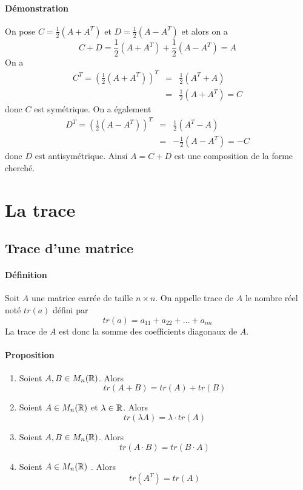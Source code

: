 \paragraph{Démonstration}  On pose $C = \frac{1}{2} ( A + A^{T})$ et $D = \frac{1}{2} ( A - A^{T})$ et alors on a
$$ C + D = \frac{1}{2} ( A + A^{T}) + \frac{1}{2} ( A - A^{T}) = A$$
On a 
\begin{eqnarray*} 
  C^{T} = (\frac{1}{2} ( A + A^{T}))^{T} &=& \frac{1}{2} ( A^{T} + A) \\
    &=& \frac{1}{2} ( A + A^{T}) = C
\end{eqnarray*}
donc $C$ est symétrique. On a également
\begin{eqnarray*}
  D^{T} = (\frac{1}{2} ( A - A^{T}))^{T} &=& \frac{1}{2} ( A^{T} - A) \\
    &=& -\frac{1}{2} ( A - A^{T}) = -C
\end{eqnarray*}
donc $D$ est antisymétrique. Ainsi $A = C + D$ est une composition de la forme cherché.

%
%
\section{La trace}
%
%
%
\subsection{Trace d'une matrice}
%
\paragraph{Définition} Soit $A$ une matrice carrée de taille $n\times n$. On appelle trace de $A$ le nombre réel noté $tr(a)$ défini par
$$tr(a) = a_{11} + a_{22} + \ldots + a_{nn}$$
La trace de $A$ est donc la somme des coefficients diagonaux de $A$.

\paragraph{Proposition}
\begin{enumerate}[1)]
  \item Soient $A, B \in M_{n}(\mathbb{R})$. Alors
    $$tr(A + B) = tr(A) + tr(B)$$
  \item Soient $A \in M_{n}(\mathbb{R})$ et $\lambda \in \mathbb{R}$. Alors
    $$tr(\lambda A) = \lambda \cdot tr(A)$$
  \item Soient $A, B \in M_{n}(\mathbb{R})$. Alors
    $$tr(A \cdot B) = tr(B \cdot A)$$
  \item Soient $A \in M_{n}(\mathbb{R})$ . Alors
    $$tr(A^{T}) = tr(A)$$
\end{enumerate}

